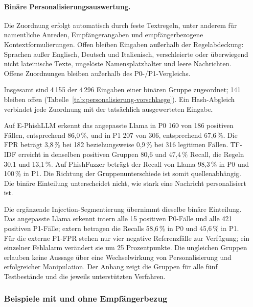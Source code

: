 \documentclass[12pt,twoside=false,a4paper,parskip]{scrbook}
\begin{document}
\paragraph{Binäre Personalisierungsauswertung.}\label{sec:personalisierung-vorschlaege}
Die Zuordnung erfolgt automatisch durch feste Textregeln, unter anderem für namentliche Anreden, Empfängerangaben und empfängerbezogene Kontextformulierungen. Offen bleiben Eingaben außerhalb der Regelabdeckung: Sprachen außer Englisch, Deutsch und Italienisch, verschleierte oder überwiegend nicht lateinische Texte, ungelöste Namensplatzhalter und leere Nachrichten. Offene Zuordnungen bleiben außerhalb des P0-/P1-Vergleichs.



Insgesamt sind 4\,155 der 4\,296 Eingaben einer binären Gruppe zugeordnet; 141 bleiben offen (Tabelle~\ref{tab:personalisierung-vorschlaege}). Ein Hash-Abgleich verbindet jede Zuordnung mit der tatsächlich ausgewerteten Eingabe.

Auf E-PhishLLM erkennt das angepasste Llama in P0 160 von 186 positiven Fällen, entsprechend 86{,}0\,\%, und in P1 207 von 306, entsprechend 67{,}6\,\%. Die FPR beträgt 3{,}8\,\% bei 182 beziehungsweise 0{,}9\,\% bei 316 legitimen Fällen. TF-IDF erreicht in denselben positiven Gruppen 80{,}6 und 47{,}4\,\% Recall, die Regeln 30{,}1 und 13{,}1\,\%. Auf PhishFuzzer beträgt der Recall von Llama 98{,}3\,\% in P0 und 100\,\% in P1. Die Richtung der Gruppenunterschiede ist somit quellenabhängig. Die binäre Einteilung unterscheidet nicht, wie stark eine Nachricht personalisiert ist.

Die ergänzende Injection-Segmentierung übernimmt dieselbe binäre Einteilung. Das angepasste Llama erkennt intern alle 15 positiven P0-Fälle und alle 421 positiven P1-Fälle; extern betragen die Recalls 58{,}6\,\% in P0 und 45{,}6\,\% in P1. Für die externe P1-FPR stehen nur vier negative Referenzfälle zur Verfügung; ein einzelner Fehlalarm verändert sie um 25 Prozentpunkte. Die ungleichen Gruppen erlauben keine Aussage über eine Wechselwirkung von Personalisierung und erfolgreicher Manipulation. Der Anhang zeigt die Gruppen für alle fünf Testbestände und die jeweils unterstützten Verfahren.

\subsubsection{Beispiele mit und ohne Empfängerbezug}\label{sec:personalisierung-beispiele}
\end{document}
